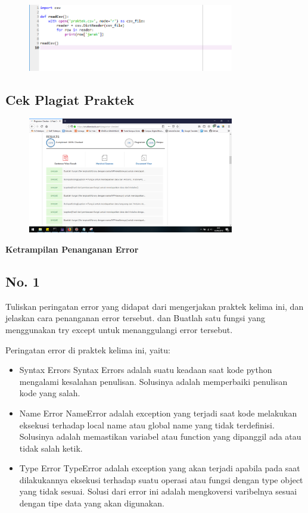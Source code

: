 \begin{figure}[H]
	\includegraphics[width=9cm]{figures/5/1174086/Praktek/csv.png}
	\centering
\end{figure}

\subsection{Cek Plagiat Praktek}
\begin{figure}[H]
	\includegraphics[width=9cm]{figures/5/1174086/Praktek/plagiatpraktek.png}
	\centering
\end{figure}

\hfill \break
{\Large \textbf{Ketrampilan Penanganan Error}}

\subsection{ No. 1}
Tuliskan  peringatan  error  yang  didapat  dari  mengerjakan  praktek  kelima  ini, dan  jelaskan  cara  penanganan  error  tersebut.   dan  Buatlah  satu  fungsi  yang menggunakan try except untuk menanggulangi error tersebut.

\hfill \break
Peringatan error di praktek kelima ini, yaitu:
\begin{itemize}
	\item Syntax Errors
	Syntax Errors adalah suatu keadaan saat kode python mengalami kesalahan penulisan. Solusinya adalah memperbaiki penulisan kode yang salah.
	
	\item Name Error
	NameError adalah exception yang terjadi saat kode melakukan eksekusi terhadap local name atau global name yang tidak terdefinisi. Solusinya adalah memastikan variabel atau function yang dipanggil ada atau tidak salah ketik.
	
	\item Type Error
	TypeError adalah exception yang akan terjadi apabila pada saat dilakukannya eksekusi terhadap suatu operasi atau fungsi dengan type object yang tidak sesuai. Solusi dari error ini adalah mengkoversi varibelnya sesuai dengan tipe data yang akan digunakan.
\end{itemize}

